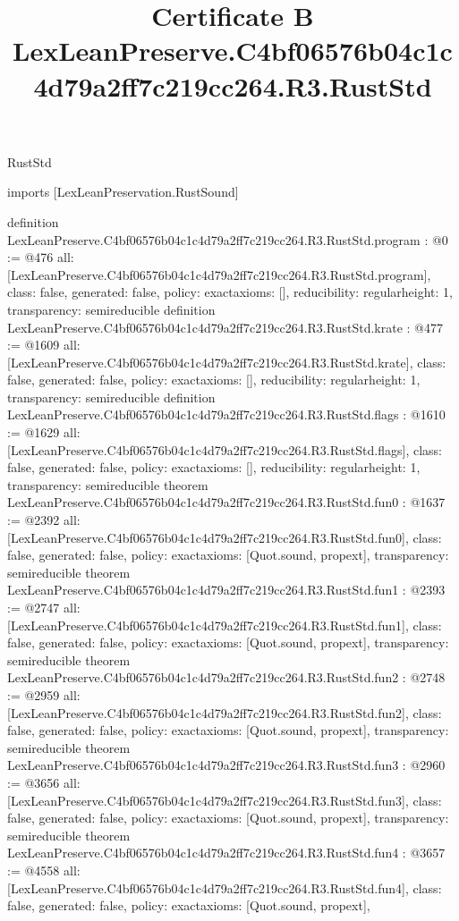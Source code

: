\begin{lexlean}{RustStd}
\title{Certificate B LexLeanPreserve.C4bf06576b04c1c4d79a2ff7c219cc264.R3.RustStd}
\begin{coremodule}
imports [LexLeanPreservation.RustSound]

definition LexLeanPreserve.C4bf06576b04c1c4d79a2ff7c219cc264.R3.RustStd.program : @0 := @476 {
  all: [LexLeanPreserve.C4bf06576b04c1c4d79a2ff7c219cc264.R3.RustStd.program],
  class: false,
  generated: false,
  policy: exact{axioms: []},
  reducibility: regular{height: 1},
  transparency: semireducible
}
definition LexLeanPreserve.C4bf06576b04c1c4d79a2ff7c219cc264.R3.RustStd.krate : @477 := @1609 {
  all: [LexLeanPreserve.C4bf06576b04c1c4d79a2ff7c219cc264.R3.RustStd.krate],
  class: false,
  generated: false,
  policy: exact{axioms: []},
  reducibility: regular{height: 1},
  transparency: semireducible
}
definition LexLeanPreserve.C4bf06576b04c1c4d79a2ff7c219cc264.R3.RustStd.flags : @1610 := @1629 {
  all: [LexLeanPreserve.C4bf06576b04c1c4d79a2ff7c219cc264.R3.RustStd.flags],
  class: false,
  generated: false,
  policy: exact{axioms: []},
  reducibility: regular{height: 1},
  transparency: semireducible
}
theorem LexLeanPreserve.C4bf06576b04c1c4d79a2ff7c219cc264.R3.RustStd.fun0 : @1637 := @2392 {
  all: [LexLeanPreserve.C4bf06576b04c1c4d79a2ff7c219cc264.R3.RustStd.fun0],
  class: false,
  generated: false,
  policy: exact{axioms: [Quot.sound, propext]},
  transparency: semireducible
}
theorem LexLeanPreserve.C4bf06576b04c1c4d79a2ff7c219cc264.R3.RustStd.fun1 : @2393 := @2747 {
  all: [LexLeanPreserve.C4bf06576b04c1c4d79a2ff7c219cc264.R3.RustStd.fun1],
  class: false,
  generated: false,
  policy: exact{axioms: [Quot.sound, propext]},
  transparency: semireducible
}
theorem LexLeanPreserve.C4bf06576b04c1c4d79a2ff7c219cc264.R3.RustStd.fun2 : @2748 := @2959 {
  all: [LexLeanPreserve.C4bf06576b04c1c4d79a2ff7c219cc264.R3.RustStd.fun2],
  class: false,
  generated: false,
  policy: exact{axioms: [Quot.sound, propext]},
  transparency: semireducible
}
theorem LexLeanPreserve.C4bf06576b04c1c4d79a2ff7c219cc264.R3.RustStd.fun3 : @2960 := @3656 {
  all: [LexLeanPreserve.C4bf06576b04c1c4d79a2ff7c219cc264.R3.RustStd.fun3],
  class: false,
  generated: false,
  policy: exact{axioms: [Quot.sound, propext]},
  transparency: semireducible
}
theorem LexLeanPreserve.C4bf06576b04c1c4d79a2ff7c219cc264.R3.RustStd.fun4 : @3657 := @4558 {
  all: [LexLeanPreserve.C4bf06576b04c1c4d79a2ff7c219cc264.R3.RustStd.fun4],
  class: false,
  generated: false,
  policy: exact{axioms: [Quot.sound, propext]},
}
\end{coremodule}
\end{lexlean}
